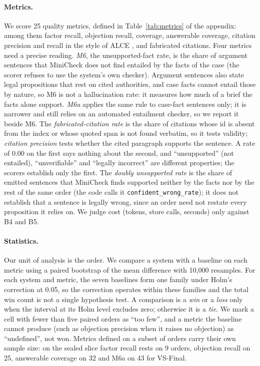 \documentclass[11pt]{article}
\let\vsaddcontentsline\addcontentsline
\let\addcontentsline\vsaddcontentsline
\newcommand{\vs}{VS-Final}
\def\vsstrip#1.\vsend{#1}
\newcommand{\para}[1]{\paragraph{#1}\addcontentsline{toc}{subsection}{\vsstrip#1\vsend}}
\begin{document}
\para{Metrics.} We score 25 quality metrics, defined in Table~\ref{tab:metrics} of the appendix: among them factor recall, objection recall, coverage, answerable coverage, citation precision and recall in the style of ALCE \citep{gao2023alce}, and fabricated citations. Four metrics need a precise reading. \emph{M6}, the unsupported-fact rate, is the share of argument sentences that MiniCheck \citep{tang2024minicheck} does not find entailed by the facts of the case (the scorer refuses to use the system's own checker). Argument sentences also state legal propositions that rest on cited authorities, and case facts cannot entail those by nature, so M6 is not a hallucination rate: it measures how much of a brief the facts alone support. \emph{M6a} applies the same rule to case-fact sentences only; it is narrower and still relies on an automated entailment checker, so we report it beside M6. The \emph{fabricated-citation rate} is the share of citations whose id is absent from the index or whose quoted span is not found verbatim, so it tests validity; \emph{citation precision} tests whether the cited paragraph supports the sentence. A rate of 0.00 on the first says nothing about the second, and ``unsupported'' (not entailed), ``unverifiable'' and ``legally incorrect'' are different properties; the scorers establish only the first. The \emph{doubly unsupported rate} is the share of emitted sentences that MiniCheck finds supported neither by the facts nor by the rest of the same order (the code calls it \texttt{confident\_wrong\_rate}); it does not establish that a sentence is legally wrong, since an order need not restate every proposition it relies on. We judge cost (tokens, store calls, seconds) only against B4 and B5.

\para{Statistics.} Our unit of analysis is the order. We compare a system with a baseline on each metric using a paired bootstrap of the mean difference with 10,000 resamples. For each system and metric, the seven baselines form one family under Holm's correction at 0.05, so the correction operates within these families and the total win count is not a single hypothesis test. A comparison is a \emph{win} or a \emph{loss} only when the interval at its Holm level excludes zero; otherwise it is a \emph{tie}. We mark a cell with fewer than five paired orders as ``too few'', and a metric the baseline cannot produce (such as objection precision when it raises no objection) as ``undefined'', not won. Metrics defined on a subset of orders carry their own sample size: on the sealed slice factor recall rests on 9 orders, objection recall on 25, answerable coverage on 32 and M6a on 43 for \vs{}.
\end{document}
